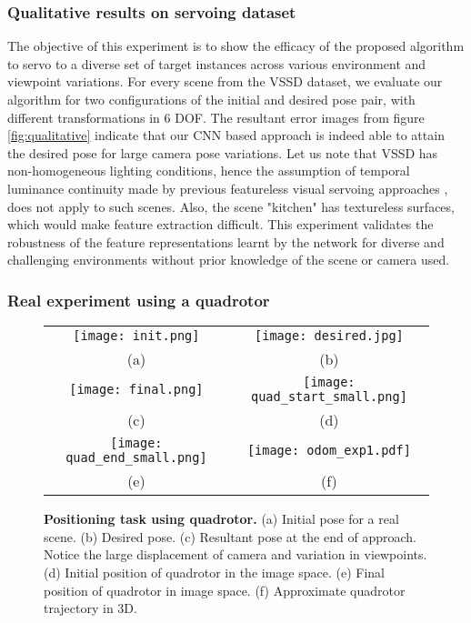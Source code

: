 \documentclass[usletter, 10 pt, conference]{ieeeconf}  %
\begin{document}
\subsubsection{Qualitative results on servoing dataset}
The objective of this experiment is to show the efficacy of the proposed algorithm to servo to a diverse set of target instances across various environment and viewpoint variations. For every scene from the VSSD dataset, we evaluate our algorithm for two configurations of the initial and desired pose pair, with different transformations in $6$ DOF. The resultant error images from figure \ref{fig:qualitative} indicate that our CNN based approach is indeed able to attain the desired pose for large camera pose variations. Let us note that VSSD has non-homogeneous lighting conditions, hence the assumption of temporal luminance continuity made by previous featureless visual servoing approaches \cite{photometricvs}, \cite{gradientvs} does not apply to such scenes. Also, the scene "kitchen" has textureless surfaces, which would make feature extraction difficult. This experiment validates the robustness of the feature representations learnt by the network for diverse and challenging environments without prior knowledge of the scene or camera used. 

\subsubsection{Real experiment using a quadrotor}

\begin{figure}[h!]
\begin{center}
\begin{tabular}{cc}
\texttt{[image: init.png]} &
\texttt{[image: desired.jpg]} \\
(a) & (b) \\
\texttt{[image: final.png]} &
\texttt{[image: quad\_start\_small.png]} \\
(c) & (d) \\
\texttt{[image: quad\_end\_small.png]} & 
\texttt{[image: odom\_exp1.pdf]}
\\
(e) & (f)
\end{tabular}
\end{center}
\caption{\textbf{Positioning task using quadrotor.} (a) Initial pose for a real scene. (b) Desired pose. (c) Resultant pose at the end of approach. Notice the large displacement of camera and variation in viewpoints. (d) Initial position of quadrotor in the image space. (e) Final position of quadrotor in image space. (f) Approximate quadrotor trajectory in 3D.}
\label{fig:quad}
\vspace{-0.50em}
\end{figure}
\end{document}
